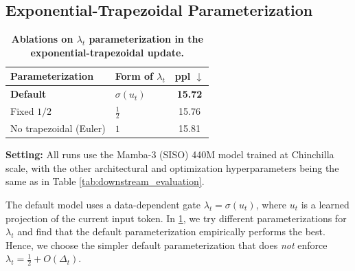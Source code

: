 \subsection{Exponential-Trapezoidal Parameterization}
\label{app:trap-param}
\begin{table}[h]
    \centering
    \small
    \caption{\textbf{Ablations on $\lambda_t$ parameterization in the exponential-trapezoidal update.}} 
    \begin{tabular}{l l c}
        \toprule
        \textbf{Parameterization} & \textbf{Form of $\lambda_t$} & \textbf{ppl $\downarrow$} \\
        \midrule
        \textbf{Default} & $\sigma(u_t)$ & \textbf{15.72} \\[5pt]
        Fixed $1/2$          & $\tfrac{1}{2}$ & 15.76 \\[5pt]
        No trapezoidal (Euler)      & $1$ & 15.81 \\
        \bottomrule
    \end{tabular}
    \label{tab:lambda_param_abl}
\end{table}

\textbf{Setting:} All runs use the Mamba-3 (SISO) 440M model trained at Chinchilla scale, with the other architectural and optimization hyperparameters being the same as in Table \ref{tab:downstream_evaluation}.

The default model uses a data-dependent gate 
$\lambda_t = \sigma(u_t)$, where $u_t$ is a learned projection of the current input token. 
In \cref{tab:lambda_param_abl}, we try different parameterizations for
$\lambda_t$ and find that the default parameterization empirically performs the best.
Hence, we choose the simpler default 
parameterization that does \emph{not} enforce \(\lambda_t = \tfrac{1}{2}+ O(\Delta_t)\).
